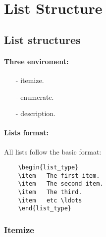 \section{List Structure}
\subsection{List structures}
\paragraph{Three enviroment:}
\begin{itemize}
	\item[-] itemize.
	\item[-] enumerate.
	\item[-] description.
\end{itemize}
\paragraph{Lists format:}
All lists follow the basic format:
\begin{verbatim}
	\begin{list_type}
	\item	The first item.
	\item	The second item.
	\item	The third.
	\item	etc \ldots
	\end{list_type}
\end{verbatim}

\subsubsection{Itemize}
